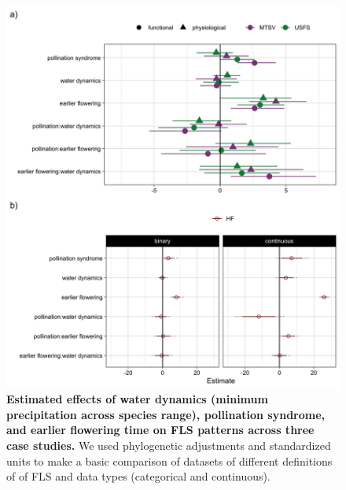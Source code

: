 \documentclass{article}
\begin{document}
  \begin{figure}[ht]
    \centering
    \includegraphics[width=\textwidth]{..//muplots.jpeg}
    \caption{\textbf{Estimated effects of water dynamics (minimum precipitation across species range), pollination syndrome, and earlier flowering time on FLS patterns across three case studies.} We used phylogenetic adjustments and standardized units to make a basic comparison of datasets of different  definitions of of FLS and  data types (categorical and continuous).  }
  \label{fig:muplots}
    \end{figure}

\end{document}
